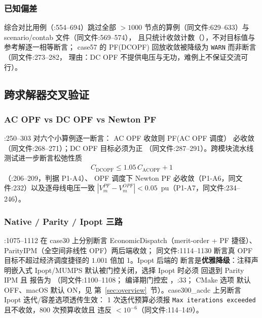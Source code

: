 \subsubsection*{已知偏差}
综合对比用例（:554--694）跳过全部
$>1000$ 节点的算例（同文件:629--633）与 scenario/contab 文件（同文件:569--574），
且只统计收敛计数（），不对目标值与参考解逐一相等断言；
case57 的 PF(DCOPF) 回放收敛被降级为 \texttt{WARN} 而非断言（同文件:273--282，
理由：DC OPF 不提供电压与无功，难例上不保证交流可行）。

\subsection{跨求解器交叉验证}\label{subsec:ver:crossval}

\subsubsection*{AC OPF vs DC OPF vs Newton PF}
:250--303 对六个小算例逐一断言：
AC OPF 收敛则 PF(AC OPF 调度） 必收敛（同文件:268--271）；DC OPF 目标必须为正
（同文件:287--291）。跨模块流水线测试进一步断言松弛性质
\begin{align*}
C_{\mathrm{DCOPF}} \le 1.05\,C_{\mathrm{ACOPF}} + 1
\end{align*}
（:206--209，判据 P1-A4）、
OPF 调度下 Newton PF 必收敛（P1-A6，同文件:232）以及逐母线电压一致
$|V_m^{PF}-V_m^{OPF}|<0.05$~pu（P1-A7，同文件:234--246）。

\subsubsection*{Native / Parity / Ipopt 三路}
:1075--1112 在 case30 上分别断言
EconomicDispatch（merit-order + PF 捷径）、ParityIPM（全空间非线性 OPF）两后端收敛；
同文件:1114--1130 断言真 OPF 目标不超过经济调度捷径的 $1.001$ 倍加 1。Ipopt 后端的
断言是\textbf{优雅降级}：注释声明嵌入式 Ipopt/MUMPS 默认被门控关闭，选择 Ipopt 时必须
回退到 Parity IPM 且  报告为 （同文件:1100--1108；
编译期门控宏 ，:33；
CMake 选项  默认 OFF、macOS 默认 ON，见
第~\ref{sec:overview}~节）。case300\_acdc 上另断言 Ipopt 迭代/容差选项透传生效：
1 次迭代预算必须报 \texttt{Max iterations exceeded} 且不收敛，800 次预算收敛且
违反 $<10^{-6}$（同文件:114--149）。

